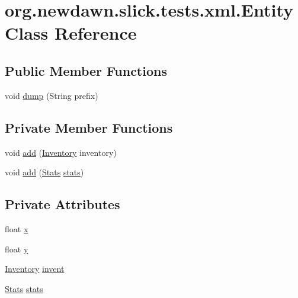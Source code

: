 \hypertarget{classorg_1_1newdawn_1_1slick_1_1tests_1_1xml_1_1_entity}{}\section{org.\+newdawn.\+slick.\+tests.\+xml.\+Entity Class Reference}
\label{classorg_1_1newdawn_1_1slick_1_1tests_1_1xml_1_1_entity}
\subsection*{Public Member Functions}
\begin{DoxyCompactItemize}
\item 
void \mbox{\hyperlink{classorg_1_1newdawn_1_1slick_1_1tests_1_1xml_1_1_entity_a9b7da9305e7a8efcc31042a65170cec2}{dump}} (String prefix)
\end{DoxyCompactItemize}
\subsection*{Private Member Functions}
\begin{DoxyCompactItemize}
\item 
void \mbox{\hyperlink{classorg_1_1newdawn_1_1slick_1_1tests_1_1xml_1_1_entity_aed34145378df65de2af166d8a30e1cd9}{add}} (\mbox{\hyperlink{classorg_1_1newdawn_1_1slick_1_1tests_1_1xml_1_1_inventory}{Inventory}} inventory)
\item 
void \mbox{\hyperlink{classorg_1_1newdawn_1_1slick_1_1tests_1_1xml_1_1_entity_aab6a1cb7b53b0bd0ef1df57f03407751}{add}} (\mbox{\hyperlink{classorg_1_1newdawn_1_1slick_1_1tests_1_1xml_1_1_stats}{Stats}} \mbox{\hyperlink{classorg_1_1newdawn_1_1slick_1_1tests_1_1xml_1_1_entity_ab3afbe872882f8df21ceaea027b85ffb}{stats}})
\end{DoxyCompactItemize}
\subsection*{Private Attributes}
\begin{DoxyCompactItemize}
\item 
float \mbox{\hyperlink{classorg_1_1newdawn_1_1slick_1_1tests_1_1xml_1_1_entity_af0aa8c1d6dc8e8f31cf9fffca28bfd00}{x}}
\item 
float \mbox{\hyperlink{classorg_1_1newdawn_1_1slick_1_1tests_1_1xml_1_1_entity_ac9fd9cf691a90fd470ccfde9be5a3d19}{y}}
\item 
\mbox{\hyperlink{classorg_1_1newdawn_1_1slick_1_1tests_1_1xml_1_1_inventory}{Inventory}} \mbox{\hyperlink{classorg_1_1newdawn_1_1slick_1_1tests_1_1xml_1_1_entity_acd01fa984ba073425ec57b2c071c397f}{invent}}
\item 
\mbox{\hyperlink{classorg_1_1newdawn_1_1slick_1_1tests_1_1xml_1_1_stats}{Stats}} \mbox{\hyperlink{classorg_1_1newdawn_1_1slick_1_1tests_1_1xml_1_1_entity_ab3afbe872882f8df21ceaea027b85ffb}{stats}}
\end{DoxyCompactItemize}


